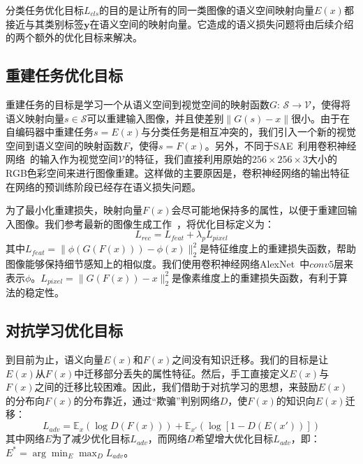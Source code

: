 分类任务优化目标$L_{cls}$的目的是让所有的同一类图像的语义空间映射向量$E(x)$都接近与其类别标签$\mathbf{y}$在语义空间的映射向量。它造成的语义损失问题将由后续介绍的两个额外的优化目标来解决。


\subsection{重建任务优化目标}
重建任务的目标是学习一个从语义空间到视觉空间的映射函数$G$: $\mathcal{S}\rightarrow \mathcal{V}$，使得将语义映射向量$s\in\mathcal{S}$可以重建输入图像，并且使差别$\|G(s)-x\|$很小。由于在自编码器中重建任务$s = E(x)$与分类任务是相互冲突的，我们引入一个新的视觉空间到语义空间的映射函数$F$，使得$s = F(x)$。另外，不同于SAE~\cite{kodirov2017semantic}利用卷积神经网络~\cite{he2016deep,simonyan2015very}的输入作为视觉空间$\mathcal{V}$的特征，我们直接利用原始的$256\times 256 \times 3$大小的RGB色彩空间来进行图像重建。这样做的主要原因是，卷积神经网络的输出特征在网络的预训练阶段已经存在语义损失问题。


为了最小化重建损失，映射向量$F(x)$会尽可能地保持多的属性，以便于重建回输入图像。我们参考最新的图像生成工作~\cite{johnson2016perceptual,dosovitskiy2016generating,ledig2017photo}，将优化目标定义为：
\begin{equation}\label{ch3:eq:eq_3}
L_{rec} = L_{feat}+\lambda_p L_{pixel}
\end{equation}
其中$L_{feat} = \|\phi\left(G\left(F(x)\right)\right)-\phi(x)\|^2_2$是特征维度上的重建损失函数，帮助图像能够保持细节感知上的相似度。我们使用卷积神经网络AlexNet~\cite{krizhevsky2012imagenet}中$conv5$层来表示$\phi$。$L_{pixel} = \|G(F(x))-x\|^2_2$是像素维度上的重建损失函数，有利于算法的稳定性。


\subsection{对抗学习优化目标}
到目前为止，语义向量$E(x)$和$F(x)$之间没有知识迁移。我们的目标是让$E(x)$从$F(x)$中迁移部分丢失的属性特征。然后，手工直接定义$E(x)$与$F(x)$之间的迁移比较困难。因此，我们借助于对抗学习的思想，来鼓励$E(x)$的分布向$F(x)$的分布靠近，通过“欺骗”判别网络$D$，使$F(x)$的知识向$E(x)$迁移：
\begin{equation}\label{ch3:eq:eq_4}
L_{adv} = \mathbb{E}_{x}\left( \log D(F(x)) \right) + \mathbb{E}_{x'}\left( \log \left[1-D(E(x'))\right] \right)
\end{equation}
其中网络$E$为了减少优化目标$L_{adv}$，而网络$D$希望增大优化目标$L_{adv}$，即：$E^* = \arg\min_E \max_D L_{adv}$。

